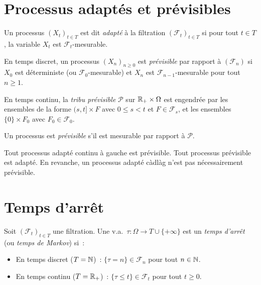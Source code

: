 \section{Processus adapt\'es et pr\'evisibles}

\begin{definition}
Un processus $(X_t)_{t \in T}$ est dit \emph{adapt\'e} \`a la filtration
$(\mathcal{F}_t)_{t \in T}$ si pour tout $t \in T$, la variable $X_t$ est
$\mathcal{F}_t$-mesurable.
\end{definition}

\begin{definition}
En temps discret, un processus $(X_n)_{n \geq 0}$ est \emph{pr\'evisible}
par rapport \`a $(\mathcal{F}_n)$ si $X_0$ est d\'eterministe (ou $\mathcal{F}_0$-mesurable)
et $X_n$ est $\mathcal{F}_{n-1}$-mesurable pour tout $n \geq 1$.
\end{definition}

\begin{definition}
\label{def:tribu_previsible}
En temps continu, la \emph{tribu pr\'evisible} $\mathcal{P}$ sur
$\mathbb{R}_+ \times \Omega$ est engendr\'ee par les ensembles de la forme
$(s, t] \times F$ avec $0 \leq s < t$ et $F \in \mathcal{F}_s$, et les ensembles
$\{0\} \times F_0$ avec $F_0 \in \mathcal{F}_0$.

Un processus est \emph{pr\'evisible} s'il est mesurable par rapport \`a $\mathcal{P}$.
\end{definition}

\begin{remarque}
Tout processus adapt\'e continu \`a gauche est pr\'evisible.
Tout processus pr\'evisible est adapt\'e.
En revanche, un processus adapt\'e c\`adl\`ag n'est pas n\'ecessairement pr\'evisible.
\end{remarque}

\section{Temps d'arr\^et}

\begin{definition}
\label{def:temps_arret}
Soit $(\mathcal{F}_t)_{t \in T}$ une filtration. Une v.a.\ $\tau : \Omega \to
T \cup \{+\infty\}$ est un \emph{temps d'arr\^et} (ou \emph{temps de Markov}) si~:
\begin{itemize}
  \item En temps discret ($T = \mathbb{N}$)~: $\{\tau = n\} \in \mathcal{F}_n$ pour tout $n \in \mathbb{N}$.
  \item En temps continu ($T = \mathbb{R}_+$)~: $\{\tau \leq t\} \in \mathcal{F}_t$ pour tout $t \geq 0$.
\end{itemize}
\end{definition}


